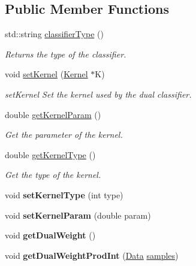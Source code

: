 \subsection*{Public Member Functions}
\begin{DoxyCompactItemize}
\item 
std\+::string \hyperlink{class_dual_classifier_afbede25a3e30b87503c0c6555d52f358}{classifier\+Type} ()
\begin{DoxyCompactList}\small\item\em Returns the type of the classifier. \end{DoxyCompactList}\item 
void \hyperlink{class_dual_classifier_a2ff6033df59ac6071300e603d0dcb7e1}{set\+Kernel} (\hyperlink{class_kernel}{Kernel} $\ast$K)
\begin{DoxyCompactList}\small\item\em set\+Kernel Set the kernel used by the dual classifier. \end{DoxyCompactList}\item 
double \hyperlink{class_dual_classifier_a5738038f99450f5f3b7098d3125ffaae}{get\+Kernel\+Param} ()
\begin{DoxyCompactList}\small\item\em Get the parameter of the kernel. \end{DoxyCompactList}\item 
double \hyperlink{class_dual_classifier_a14b35e85dddac38e7927cd03037e2353}{get\+Kernel\+Type} ()
\begin{DoxyCompactList}\small\item\em Get the type of the kernel. \end{DoxyCompactList}\item 
\mbox{\label{class_dual_classifier_aa703a5fa36da53059f9f4cc392ea4ed4}} 
void {\bfseries set\+Kernel\+Type} (int type)
\item 
\mbox{\label{class_dual_classifier_a4965a8a7c9c696b00ba22e393939bb0d}} 
void {\bfseries set\+Kernel\+Param} (double param)
\item 
\mbox{\label{class_dual_classifier_a27e6bfc3812d2d2206853697c3e09b35}} 
void {\bfseries get\+Dual\+Weight} ()
\item 
\mbox{\label{class_dual_classifier_a78f8b307852dfc630bb2b38afda50ce3}} 
void {\bfseries get\+Dual\+Weight\+Prod\+Int} (\hyperlink{class_data}{Data} \hyperlink{class_classifier_aad6a4fcea8f44339d7a6302f530852ca}{samples})
\end{DoxyCompactItemize}
